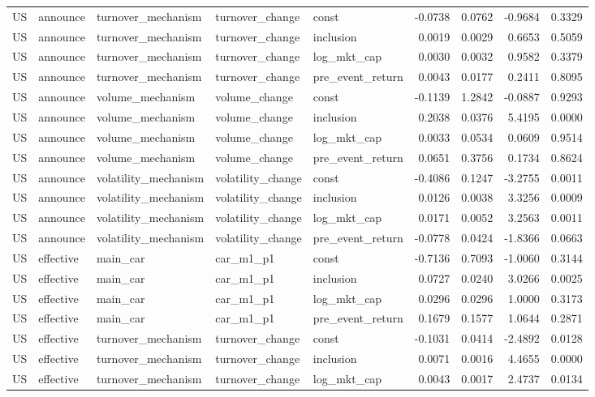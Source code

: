 \begin{tabular}{lllllrrrr}
US & announce & turnover_mechanism & turnover_change & const & -0.0738 & 0.0762 & -0.9684 & 0.3329 \\
US & announce & turnover_mechanism & turnover_change & inclusion & 0.0019 & 0.0029 & 0.6653 & 0.5059 \\
US & announce & turnover_mechanism & turnover_change & log_mkt_cap & 0.0030 & 0.0032 & 0.9582 & 0.3379 \\
US & announce & turnover_mechanism & turnover_change & pre_event_return & 0.0043 & 0.0177 & 0.2411 & 0.8095 \\
US & announce & volume_mechanism & volume_change & const & -0.1139 & 1.2842 & -0.0887 & 0.9293 \\
US & announce & volume_mechanism & volume_change & inclusion & 0.2038 & 0.0376 & 5.4195 & 0.0000 \\
US & announce & volume_mechanism & volume_change & log_mkt_cap & 0.0033 & 0.0534 & 0.0609 & 0.9514 \\
US & announce & volume_mechanism & volume_change & pre_event_return & 0.0651 & 0.3756 & 0.1734 & 0.8624 \\
US & announce & volatility_mechanism & volatility_change & const & -0.4086 & 0.1247 & -3.2755 & 0.0011 \\
US & announce & volatility_mechanism & volatility_change & inclusion & 0.0126 & 0.0038 & 3.3256 & 0.0009 \\
US & announce & volatility_mechanism & volatility_change & log_mkt_cap & 0.0171 & 0.0052 & 3.2563 & 0.0011 \\
US & announce & volatility_mechanism & volatility_change & pre_event_return & -0.0778 & 0.0424 & -1.8366 & 0.0663 \\
US & effective & main_car & car_m1_p1 & const & -0.7136 & 0.7093 & -1.0060 & 0.3144 \\
US & effective & main_car & car_m1_p1 & inclusion & 0.0727 & 0.0240 & 3.0266 & 0.0025 \\
US & effective & main_car & car_m1_p1 & log_mkt_cap & 0.0296 & 0.0296 & 1.0000 & 0.3173 \\
US & effective & main_car & car_m1_p1 & pre_event_return & 0.1679 & 0.1577 & 1.0644 & 0.2871 \\
US & effective & turnover_mechanism & turnover_change & const & -0.1031 & 0.0414 & -2.4892 & 0.0128 \\
US & effective & turnover_mechanism & turnover_change & inclusion & 0.0071 & 0.0016 & 4.4655 & 0.0000 \\
US & effective & turnover_mechanism & turnover_change & log_mkt_cap & 0.0043 & 0.0017 & 2.4737 & 0.0134 \\

\end{tabular}
